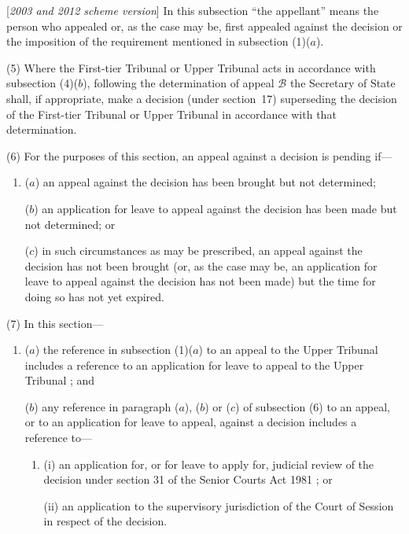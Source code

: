 \documentclass[12pt,a4paper]{article}
\begin{document}
[\emph{2003 and 2012 scheme version}] In this subsection “the appellant” means the person who appealed or, as the case may be, first appealed against the decision 
or the imposition of the requirement  %
mentioned in subsection (1)($a$).

(5) Where the 
First-tier Tribunal or Upper Tribunal  %
acts in accordance with subsection (4)($b$), following the determination of appeal $\mathcal{B}$ the 
Secretary of State  %
shall, if appropriate, make a decision (under section~17) superseding the decision of the 
First-tier Tribunal or Upper Tribunal  %
in accordance with that determination.

(6) For the purposes of this section, an appeal against a decision is pending if—
\begin{enumerate}\item[]
($a$) an appeal against the decision has been brought but not determined;

($b$) an application for leave to appeal against the decision has been made but not determined; or

($c$) in such circumstances as may be prescribed, an appeal against the decision has not been brought (or, as the case may be, an application for leave to appeal against the decision has not been made) but the time for doing so has not yet expired.
\end{enumerate}

(7) In this section—
\begin{enumerate}\item[]
($a$) the reference in subsection (1)($a$) to an appeal to 
the Upper Tribunal   %
includes a reference to an application for leave to appeal to 
the Upper Tribunal%
; and

($b$) any reference in paragraph ($a$), ($b$) or ($c$) of subsection (6) to an appeal, or to an application for leave to appeal, against a decision includes a reference to—
\begin{enumerate}\item[]
(i) an application for, or for leave to apply for, judicial review of the decision under section 31 of the 
Senior Courts Act 1981%
; or

(ii) an application to the supervisory jurisdiction of the Court of Session in respect of the decision.
\end{enumerate}
\end{enumerate}
\end{document}
